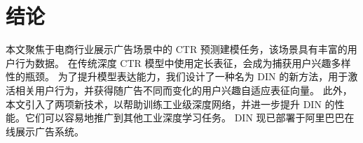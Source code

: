 \section{结论}
本文聚焦于电商行业展示广告场景中的 CTR 预测建模任务，该场景具有丰富的用户行为数据。
在传统深度 CTR 模型中使用定长表征，会成为捕获用户兴趣多样性的瓶颈。
为了提升模型表达能力，我们设计了一种名为 DIN 的新方法，用于激活相关用户行为，并获得随广告不同而变化的用户兴趣自适应表征向量。
此外，本文引入了两项新技术，以帮助训练工业级深度网络，并进一步提升 DIN 的性能。它们可以容易地推广到其他工业深度学习任务。
DIN 现已部署于阿里巴巴在线展示广告系统。

